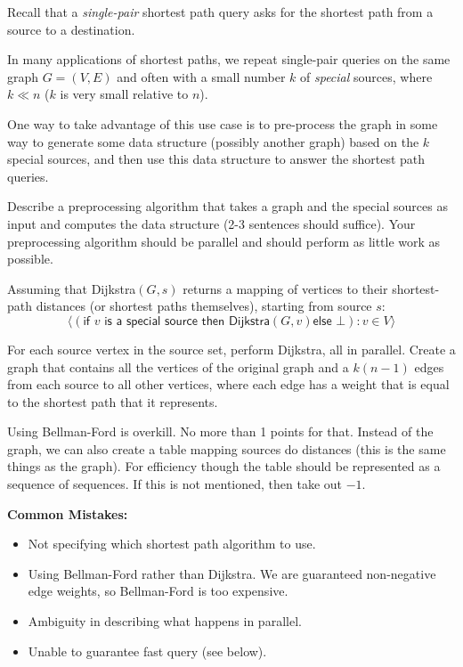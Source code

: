 \begin{problem}
Recall that a {\em single-pair} shortest path query asks for the
shortest path from a source to a destination.
%

In many applications of shortest paths, we repeat single-pair queries
on the same graph $G = (V,E)$ and often with a small number $k$ of
{\em special} sources, where $k \ll n$ ($k$ is very small relative to
$n$).


One way to take advantage of this use case is to pre-process the graph
in some way to generate some data structure (possibly another graph)
based on the $k$ special sources, and then use this data structure to
answer the shortest path queries.


\ask[4] Describe a preprocessing algorithm that takes a graph
  and the special sources as input and computes the data structure (2-3
  sentences should suffice).  Your preprocessing algorithm should be
  parallel and should perform as little work as possible.


\sol

  Assuming that \textsf{Dijkstra$(G, s)$} returns a mapping of vertices to
  their shortest-path distances (or shortest paths themselves), starting from
  source $s$:
  \[
    \big\langle (\textsf{if $v$ is a special source then Dijkstra$(G,v)$
    else $\bot$}) : v \in V \big\rangle
  \]

 For each source vertex in the source set, perform Dijkstra, all in
 parallel.  Create a graph that contains all the vertices of the
 original graph and a $k(n-1)$ edges from each source to all other
 vertices, where each edge has a weight that is equal to the shortest
 path that it represents.


\rubric Using Bellman-Ford is overkill. No more than 1 points for
that. Instead of the graph, we can also create a table mapping sources
do distances (this is the same things as the graph). For efficiency
though the table should be represented as a sequence of sequences.  If
this is not mentioned, then take out $-1$.

\notes
\textbf{Common Mistakes:}
\begin{itemize}
  \item Not specifying which shortest path algorithm to use.
  \item Using Bellman-Ford rather than Dijkstra. We are guaranteed non-negative
  edge weights, so Bellman-Ford is too expensive.
  \item Ambiguity in describing what happens in parallel.
  \item Unable to guarantee fast query (see below).
\end{itemize}



\end{problem}
